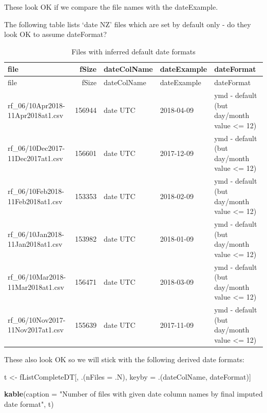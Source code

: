 \documentclass[]{article}
\newenvironment{Shaded}{\begin{snugshade}}{\end{snugshade}}
\newcommand{\KeywordTok}[1]{\textcolor[rgb]{0.13,0.29,0.53}{\textbf{#1}}}
\newcommand{\DataTypeTok}[1]{\textcolor[rgb]{0.13,0.29,0.53}{#1}}
\newcommand{\StringTok}[1]{\textcolor[rgb]{0.31,0.60,0.02}{#1}}
\newcommand{\CommentTok}[1]{\textcolor[rgb]{0.56,0.35,0.01}{\textit{#1}}}
\newcommand{\OperatorTok}[1]{\textcolor[rgb]{0.81,0.36,0.00}{\textbf{#1}}}
\newcommand{\NormalTok}[1]{#1}
\begin{document}
These look OK if we compare the file names with the dateExample.

The following table lists `date NZ' files which are set by default only
- do they look OK to assume dateFormat?

\begin{Shaded}
\end{Shaded}

\begin{longtable}[]{@{}lrlll@{}}
\caption{Files with inferred default date formats}\tabularnewline
\toprule
file & fSize & dateColName & dateExample & dateFormat\tabularnewline
\midrule
\endfirsthead
\toprule
file & fSize & dateColName & dateExample & dateFormat\tabularnewline
\midrule
\endhead
rf\_06/10Apr2018-11Apr2018at1.csv & 156944 & date UTC & 2018-04-09 & ymd
- default (but day/month value \textless{}= 12)\tabularnewline
rf\_06/10Dec2017-11Dec2017at1.csv & 156601 & date UTC & 2017-12-09 & ymd
- default (but day/month value \textless{}= 12)\tabularnewline
rf\_06/10Feb2018-11Feb2018at1.csv & 153353 & date UTC & 2018-02-09 & ymd
- default (but day/month value \textless{}= 12)\tabularnewline
rf\_06/10Jan2018-11Jan2018at1.csv & 153982 & date UTC & 2018-01-09 & ymd
- default (but day/month value \textless{}= 12)\tabularnewline
rf\_06/10Mar2018-11Mar2018at1.csv & 156471 & date UTC & 2018-03-09 & ymd
- default (but day/month value \textless{}= 12)\tabularnewline
rf\_06/10Nov2017-11Nov2017at1.csv & 155639 & date UTC & 2017-11-09 & ymd
- default (but day/month value \textless{}= 12)\tabularnewline
\bottomrule
\end{longtable}

These also look OK so we will stick with the following derived date
formats:

\begin{Shaded}
\begin{Highlighting}[]
\NormalTok{t <-}\StringTok{ }\NormalTok{fListCompleteDT[, .(}\DataTypeTok{nFiles =}\NormalTok{ .N), keyby =}\StringTok{ }\NormalTok{.(dateColName, dateFormat)]}

\KeywordTok{kable}\NormalTok{(}\DataTypeTok{caption =} \StringTok{"Number of files with given date column names by final imputed date format"}\NormalTok{, t)}
\end{Highlighting}
\end{Shaded}
\end{document}
